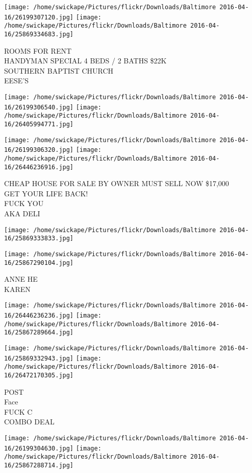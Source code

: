 \documentclass[10pt,letterpaper]{article}
\begin{document}
\texttt{[image: /home/swickape/Pictures/flickr/Downloads/Baltimore 2016-04-16/26199307120.jpg]}
\texttt{[image: /home/swickape/Pictures/flickr/Downloads/Baltimore 2016-04-16/25869334683.jpg]}

ROOMS FOR RENT\\
HANDYMAN SPECIAL 4 BEDS / 2 BATHS \$22K\\
SOUTHERN BAPTIST CHURCH\\
EESE'S
\pagebreak

\texttt{[image: /home/swickape/Pictures/flickr/Downloads/Baltimore 2016-04-16/26199306540.jpg]}
\texttt{[image: /home/swickape/Pictures/flickr/Downloads/Baltimore 2016-04-16/26405994771.jpg]}

\texttt{[image: /home/swickape/Pictures/flickr/Downloads/Baltimore 2016-04-16/26199306320.jpg]}
\texttt{[image: /home/swickape/Pictures/flickr/Downloads/Baltimore 2016-04-16/26446236916.jpg]}

CHEAP HOUSE FOR SALE BY OWNER MUST SELL NOW \$17,000\\
GET YOUR LIFE BACK!\\
FUCK YOU\\
AKA DELI
\pagebreak

\texttt{[image: /home/swickape/Pictures/flickr/Downloads/Baltimore 2016-04-16/25869333833.jpg]}

\vspace{0.25in}
\texttt{[image: /home/swickape/Pictures/flickr/Downloads/Baltimore 2016-04-16/25867290104.jpg]}

ANNE HE\\
KAREN
\pagebreak

\texttt{[image: /home/swickape/Pictures/flickr/Downloads/Baltimore 2016-04-16/26446236236.jpg]}
\texttt{[image: /home/swickape/Pictures/flickr/Downloads/Baltimore 2016-04-16/25867289664.jpg]}

\texttt{[image: /home/swickape/Pictures/flickr/Downloads/Baltimore 2016-04-16/25869332943.jpg]}
\texttt{[image: /home/swickape/Pictures/flickr/Downloads/Baltimore 2016-04-16/26472170305.jpg]}

POST\\
Face\\
FUCK C\\
COMBO DEAL
\pagebreak

\texttt{[image: /home/swickape/Pictures/flickr/Downloads/Baltimore 2016-04-16/26199304630.jpg]}
\texttt{[image: /home/swickape/Pictures/flickr/Downloads/Baltimore 2016-04-16/25867288714.jpg]}
\end{document}
